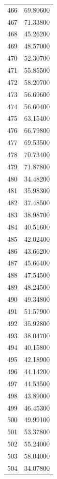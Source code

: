 \documentclass[
  letterpaper,
  DIV=11,
  numbers=noendperiod]{scrreprt}
\begin{document}
\begin{tcolorbox}
\begin{tabular}{lr}
466  &         69.80600 \\
467  &         71.33800 \\
468  &         45.26200 \\
469  &         48.57000 \\
470  &         52.30700 \\
471  &         55.85500 \\
472  &         58.20700 \\
473  &         56.69600 \\
474  &         56.60400 \\
475  &         63.15400 \\
476  &         66.79800 \\
477  &         69.53500 \\
478  &         70.73400 \\
479  &         71.87800 \\
480  &         34.48200 \\
481  &         35.98300 \\
482  &         37.48500 \\
483  &         38.98700 \\
484  &         40.51600 \\
485  &         42.02400 \\
486  &         43.66200 \\
487  &         45.66400 \\
488  &         47.54500 \\
489  &         48.24500 \\
490  &         49.34800 \\
491  &         51.57900 \\
492  &         35.92800 \\
493  &         38.04700 \\
494  &         40.15800 \\
495  &         42.18900 \\
496  &         44.14200 \\
497  &         44.53500 \\
498  &         43.89000 \\
499  &         46.45300 \\
500  &         49.99100 \\
501  &         53.37800 \\
502  &         55.24000 \\
503  &         58.04000 \\
504  &         34.07800 \\

\end{tabular}
\end{tcolorbox}
\end{document}
